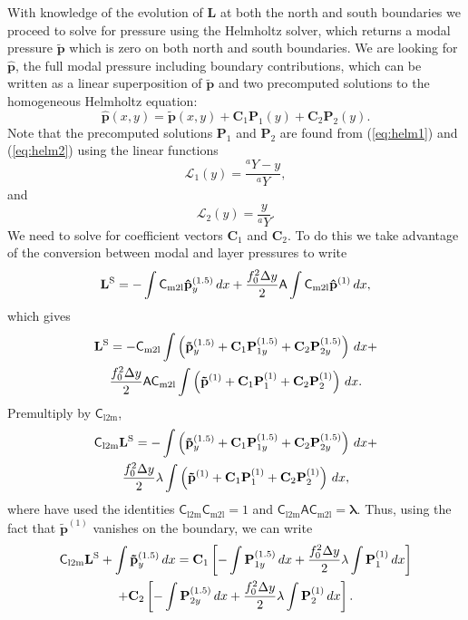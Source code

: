 \documentclass[11pt, a4paper,twoside]{article}
\newcommand{\vc}[1]{\mathbf{#1}}
\newcommand{\mtx}[1]{\vc{\mathsf{#1}}}
\newcommand{\cml}[0]{\mtx{C}_{\mathrm{m2l}}}
\newcommand{\clm}[0]{\mtx{C}_{\mathrm{l2m}}}
\numberwithin{equation}{section}
\begin{document}
With knowledge of the evolution of $\vc{L}$ at both the north and south boundaries we proceed to solve for pressure using the Helmholtz solver, which returns a modal pressure $\vc{\tilde{p}}$ which is zero on both north and south boundaries.
We are looking for $\vc{\hat{p}}$, the full modal pressure including boundary contributions, which can be written as a linear superposition of $\vc{\tilde{p}}$ and two precomputed solutions to the homogeneous Helmholtz equation:
\[\vc{\hat{p}}(x,y) = \vc{\tilde{p}}(x,y) + \vc{C}_{1}\vc{P}_{1}(y) + \vc{C}_{2}\vc{P}_{2}(y).\]
Note that the precomputed solutions $\vc{P}_{1}$ and $\vc{P}_{2}$ are found from (\ref{eq:helm1}) and (\ref{eq:helm2}) using the linear functions 
\[\mathcal{L}_1(y) = \frac{{}^aY-y}{{}^aY},\] 
and
\[\mathcal{L}_2(y)=\frac{y}{{}^aY}.\] 
We need to solve for coefficient vectors $\vc{C}_{1}$ and  $\vc{C}_{2}$.
To do this we take advantage of the conversion between modal and layer pressures to write
\[\vc{L}^{\textrm S} = - \int \cml \vc{\hat{p}}_{y}^{(1.5)}\, dx  + \frac{f_0^2 \Delta y}{2}\mtx{A}\int \cml \vc{\hat{p}}^{(1)} \, dx,\]
which gives
\begin{multline}
\vc{L}^{\textrm S} = - \cml \int \left( \vc{\tilde{p}}_{y}^{(1.5)} + \vc{C}_{1}\vc{P}_{1y}^{(1.5)} + \vc{C}_{2}\vc{P}_{2y}^{(1.5)} \right) \, dx  + \\
\frac{f_0^2 \Delta y}{2}\mtx{A}\cml \int  \left( \vc{\tilde{p}}^{(1)} + \vc{C}_{1}\vc{P}_{1}^{(1)} + \vc{C}_{2}\vc{P}_{2}^{(1)} \right)  \, dx. \nonumber
\end{multline}
Premultiply by $\clm$,
\begin{multline}
\clm \vc{L}^{\textrm S} =  - \int \left(  \vc{\tilde{p}}_{y}^{(1.5)} + \vc{C}_{1}\vc{P}_{1y}^{(1.5)} + \vc{C}_{2}\vc{P}_{2y}^{(1.5)} \right)  \, dx  +\\
 \frac{f_0^2 \Delta y}{2} \vc{\lambda} \int \left(  \vc{\tilde{p}}^{(1)} + \vc{C}_{1}\vc{P}_{1}^{(1)} + \vc{C}_{2}\vc{P}_{2}^{(1)}  \right) \, dx,\nonumber
\end{multline}
where have used the identities $\clm\cml  = 1$ and $\clm\mtx{A}\cml  = \vc{\lambda}$.
Thus, using the fact that  $\vc{\tilde{p}}^{(1)}$ vanishes on the boundary, we can write
\begin{multline}
\clm \vc{L}^{\textrm S} + \int \vc{\tilde{p}}_{y}^{(1.5)} \, dx =  \vc{C}_{1} \left[ - \int \vc{P}_{1y}^{(1.5)} \, dx +
\frac{f_0^2 \Delta y}{2} \vc{\lambda} \int \vc{P}_{1}^{(1)}  \, dx\right] \\
+  \vc{C}_{2} \left[ - \int \vc{P}_{2y}^{(1.5)} \, dx  + \frac{f_0^2 \Delta y}{2} \vc{\lambda} \int \vc{P}_{2}^{(1)} \, dx \right] .
\end{multline}
\end{document}
